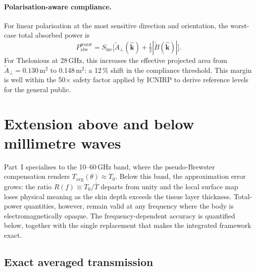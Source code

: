 \documentclass[11pt,a4paper]{article}
\theoremstyle{definition}      %
\newcommand{\khat}{\hat{\bm{k}}}
\newcommand{\Sinc}{S_{\mathrm{inc}}}
\newcommand{\Tavg}{T_{\mathrm{avg}}}
\newcommand{\Tbar}{\bar{T}}
\begin{document}
\paragraph{Polarisation-aware compliance.}
For linear polarisation at the most sensitive direction and
orientation, the worst-case total absorbed power is
\begin{equation}\label{eq:Pabs-worst-pol}
  P_{\mathrm{abs}}^{\mathrm{worst}}
  = \Sinc\bigl[\tilde{A}_\perp(\khat)
    + \tfrac{1}{2}|\tilde{B}(\khat)|\bigr].
\end{equation}
For Thelonious at 28\,GHz, this increases the effective projected
area from $\tilde{A}_\perp = 0.130$\,m$^2$ to 0.148\,m$^2$: a
12\,\% shift in the compliance threshold.  This margin is well within
the 50$\times$ safety factor applied by ICNIRP to derive reference
levels for the general public.


\section{Extension above and below millimetre waves}\label{sec:sub6}

Part~I specialises to the 10--60\,GHz band, where the
pseudo-Brewster compensation renders $\Tavg(\theta)\approx T_0$.
Below this band, the approximation error grows: the ratio
$R(f)\equiv T_0/\Tbar$ departs from unity and the local surface
map loses physical meaning as the skin depth exceeds the tissue
layer thickness.  Total-power quantities, however, remain valid at
any frequency where the body is electromagnetically opaque.
The frequency-dependent accuracy is quantified below, together with
the single replacement that makes the integrated framework exact.

\subsection{Exact averaged transmission}\label{sec:Tbar}
\end{document}

